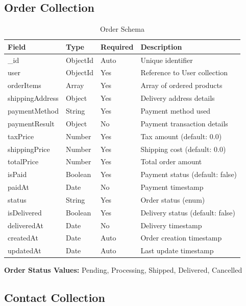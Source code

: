 \documentclass[12pt,a4paper]{article}
\begin{document}
\subsection{Order Collection}

\begin{table}[h!]
\centering
\begin{tabular}{@{}llll@{}}
\toprule
\textbf{Field} & \textbf{Type} & \textbf{Required} & \textbf{Description} \\
\midrule
\_id & ObjectId & Auto & Unique identifier \\
user & ObjectId & Yes & Reference to User collection \\
orderItems & Array & Yes & Array of ordered products \\
shippingAddress & Object & Yes & Delivery address details \\
paymentMethod & String & Yes & Payment method used \\
paymentResult & Object & No & Payment transaction details \\
taxPrice & Number & Yes & Tax amount (default: 0.0) \\
shippingPrice & Number & Yes & Shipping cost (default: 0.0) \\
totalPrice & Number & Yes & Total order amount \\
isPaid & Boolean & Yes & Payment status (default: false) \\
paidAt & Date & No & Payment timestamp \\
status & String & Yes & Order status (enum) \\
isDelivered & Boolean & Yes & Delivery status (default: false) \\
deliveredAt & Date & No & Delivery timestamp \\
createdAt & Date & Auto & Order creation timestamp \\
updatedAt & Date & Auto & Last update timestamp \\
\bottomrule
\end{tabular}
\caption{Order Schema}
\end{table}

\textbf{Order Status Values:} Pending, Processing, Shipped, Delivered, Cancelled

\subsection{Contact Collection}
\end{document}
